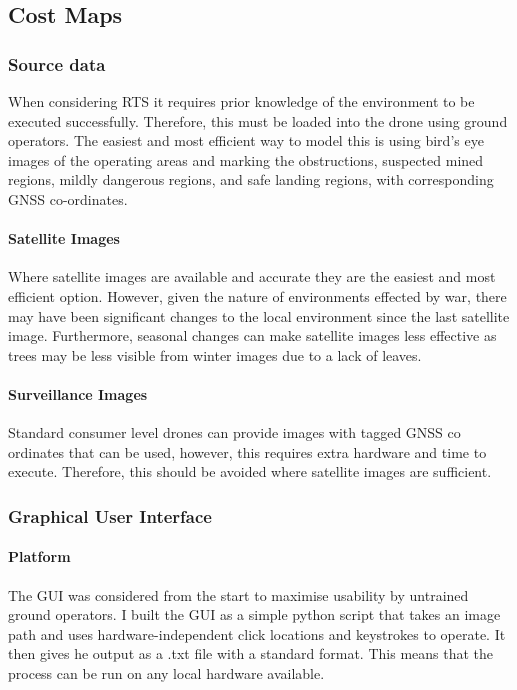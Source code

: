 \subsection{Cost Maps}
\subsubsection{Source data}
When considering \gls{RTS} it requires prior knowledge of the environment to be executed successfully. Therefore, this must be loaded into the drone using ground operators. The easiest and most efficient way to model this is using bird's eye images of the operating areas and marking the obstructions, suspected mined regions, mildly dangerous regions, and safe landing regions, with corresponding \gls{GNSS} co-ordinates.
\paragraph{Satellite Images}
Where satellite images are available and accurate they are the easiest and most efficient option. However, given the nature of environments effected by war, there may have been significant changes to the local environment since the last satellite image. Furthermore, seasonal changes can make satellite images less effective as trees may be less visible from winter images due to a lack of leaves.
\paragraph{Surveillance Images}
Standard consumer level drones can provide images with tagged \gls{GNSS} co ordinates that can be used, however, this requires extra hardware and time to execute. Therefore, this should be avoided where satellite images are sufficient.

\subsubsection{Graphical User Interface}
\paragraph{Platform} 
The \gls{GUI} was considered from the start to maximise usability by untrained ground operators. I built the \gls{GUI} as a simple python script that takes an image path and uses hardware-independent click locations and keystrokes to operate. It then gives he output as a .txt file with a standard format. This means that the process can be run on any local hardware available.
